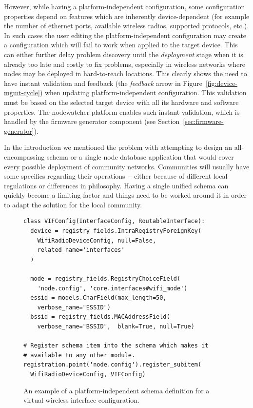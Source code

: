 \documentclass[5p,sort&compress]{elsarticle}
\begin{document}
However, while having a platform-independent configuration, some configuration properties depend on features which are inherently device-dependent (for example the number of ethernet ports, available wireless radios, supported protocols, etc.).
In such cases the user editing the platform-independent configuration may create a configuration which will fail to work when applied to the target device.
This can either further delay problem discovery until the \textit{deployment} stage when it is already too late and costly to fix problems, especially in wireless networks where nodes may be deployed in hard-to-reach locations.
This clearly shows the need to have instant validation and feedback (the \textit{feedback} arrow in Figure~\ref{fig:device-mgmt-cycle}) when updating platform-independent configuration.
This validation must be based on the selected target device with all its hardware and software properties.
The nodewatcher platform enables such instant validation, which is handled by the firmware generator component (see Section~\ref{sec:firmware-generator}).

In the introduction we mentioned the problem with attempting to design an all-encompassing schema or a single node database application that would cover every possible deployment of community networks.
Communities will usually have some specifics regarding their operations~-- either because of different local regulations or differences in philosophy.
Having a single unified schema can quickly become a limiting factor and things need to be worked around it in order to adapt the solution for the local community.

\begin{figure}
\centering
\begin{verbatim}
class VIFConfig(InterfaceConfig, RoutableInterface):
  device = registry_fields.IntraRegistryForeignKey(
    WifiRadioDeviceConfig, null=False,
    related_name='interfaces'
  )

  mode = registry_fields.RegistryChoiceField(
    'node.config', 'core.interfaces#wifi_mode')
  essid = models.CharField(max_length=50,
    verbose_name="ESSID")
  bssid = registry_fields.MACAddressField(
    verbose_name="BSSID",  blank=True, null=True)

# Register schema item into the schema which makes it
# available to any other module.
registration.point('node.config').register_subitem(
  WifiRadioDeviceConfig, VIFConfig)
\end{verbatim}
\caption{An example of a platform-independent schema definition for a virtual wireless interface configuration.}
\label{fig:schema-module-wifi}
\end{figure}
\end{document}
